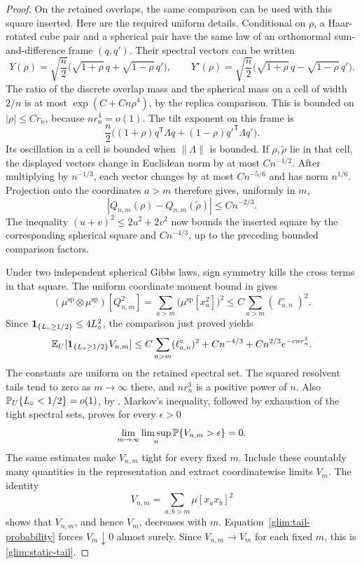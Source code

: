 \begin{proof}
On the retained overlaps, the same comparison can be used with this
square inserted.  Here are the required uniform details.  Conditional
on \(\rho\), a Haar-rotated cube pair and a spherical pair have the
same law of an orthonormal sum-and-difference frame \((q,q')\).
Their spectral vectors can be written
\[
 Y(\rho)=\sqrt{\frac n2}
       \big(\sqrt{1+\rho}\,q+\sqrt{1-\rho}\,q'\big),\qquad
 Y'(\rho)=\sqrt{\frac n2}
       \big(\sqrt{1+\rho}\,q-\sqrt{1-\rho}\,q'\big).
\]
The ratio of the discrete overlap mass and the spherical mass on a
cell of width \(2/n\) is at most \(\exp(C+C n\rho^4)\), by the
replica comparison.  This is bounded on \(|\rho|\le C r_n\), because
\(n r_n^4=o(1)\).  The tilt exponent on this frame is
\[
 \frac n2\big((1+\rho)q^{\mathsf T}\Lambda q
                    +(1-\rho){q'}^{\mathsf T}\Lambda q'\big).
\]
Its oscillation in a cell is bounded when \(\|\Lambda\|\) is bounded.
If \(\rho,\widetilde\rho\) lie in that cell, the displayed vectors
change in Euclidean norm by at most \(C n^{-1/2}\).  After multiplying
by \(n^{-1/3}\), each vector changes by at most \(C n^{-5/6}\) and
has norm \(n^{1/6}\).  Projection onto the coordinates \(a>m\)
therefore gives, uniformly in \(m\),
\[
 |Q_{n,m}(\rho)-Q_{n,m}(\widetilde\rho)|\le C n^{-2/3}.
\]
The inequality \((u+v)^2\le2u^2+2v^2\) now bounds the inserted square
by the corresponding spherical square and \(C n^{-4/3}\), up to
the preceding bounded comparison factors.

Under two independent spherical Gibbs laws, sign symmetry kills the
cross terms in that square.  The uniform coordinate moment bound in
\cite[Proposition~2.3]{FUA} gives
\[
 (\mu^{\mathrm{sp}}\otimes\mu^{\mathrm{sp}})[Q_{n,m}^2]
 =\sum_{a>m}\big(\mu^{\mathrm{sp}}[x_a^2]\big)^2
 \le C\sum_{a>m}(\ell_{a,n}^\circ)^2.
\]
Since \(\mathbf 1_{\{L_\circ\ge1/2\}}\le4L_\circ^2\), the comparison just
proved yields
\begin{equation}
 \mathbb E_U[\mathbf 1_{\{L_\circ\ge1/2\}}V_{n,m}]
 \le C\sum_{a>m}(\ell_{a,n}^\circ)^2
       +C n^{-4/3}+C n^{2/3}e^{-c n r_n^3}.
 \label{glim:tail-haar}
\end{equation}
The constants are uniform on the retained spectral set.  The squared
resolvent tails tend to zero as \(m\to\infty\) there, and \(n r_n^3\)
is a positive power of \(n\).  Also
\(\mathbb P_U\{L_\circ<1/2\}=o(1)\), by
\cite[Lemma~2.5]{FUA}.  Markov's inequality, followed by exhaustion
of the tight spectral sets, proves for every \(\epsilon>0\)
\begin{equation}
 \lim_{m\to\infty}\limsup_n
       \mathbb P\{V_{n,m}>\epsilon\}=0.
 \label{glim:tail-probability}
\end{equation}
The same estimates make \(V_{n,m}\) tight for every fixed \(m\).
Include these countably many quantities in the representation and
extract coordinatewise limits \(V_m\).  The identity
\[
 V_{n,m}=\sum_{a,b>m}\mu[x_ax_b]^2
\]
shows that \(V_{n,m}\), and hence \(V_m\), decreases with \(m\).
Equation~\eqref{glim:tail-probability} forces \(V_m\downarrow0\)
almost surely.  Since \(V_{n,m}\to V_m\) for each fixed \(m\), this is
\eqref{glim:static-tail}.


\end{proof}
